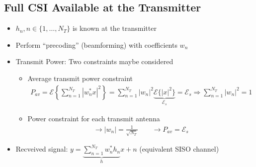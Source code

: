 \documentclass[a4paper, 10pt]{article}
\begin{document}
\subsection{Full CSI Available at the Transmitter}
\begin{itemize}
	\item $h_n, n \in \{1,\dots,N_T\}$ is known at the transmitter
	\item Perform ``precoding'' (beamforming) with coefficients $w_n$
\end{itemize}

\begin{itemize}
	\item Transmit Power: Two constraints maybe considered
	\begin{itemize}
		\item Average transmit power constraint
		\begin{align*}
		P_{av}=\mathcal{E}\left\{\sum\limits^{N_T}_{n=1}|w_n^*x|^2\right\}=\sum\limits_{n=1}^{N_T}|w_n|^2\underbrace{\mathcal{E}\{|x|^2\}}_{\mathcal{E}_s}=\mathcal{E}_s \Rightarrow \sum\limits^{N_T}_{n=1}|w_n|^2=1
		\end{align*}
		\item Power constraint for each transmit antenna
		\begin{align*}
		\rightarrow |w_n|=\frac{1}{\sqrt{N_T}} \qquad \rightarrow P_{av}=\mathcal{E}_s
		\end{align*}
	\end{itemize}
	\item Recveived signal: $y=\underbrace{\sum\limits^{N_T}_{n=1}w^*_nh_n}_{h}x+n$ (equivalent SISO channel)
\end{itemize}
\end{document}
